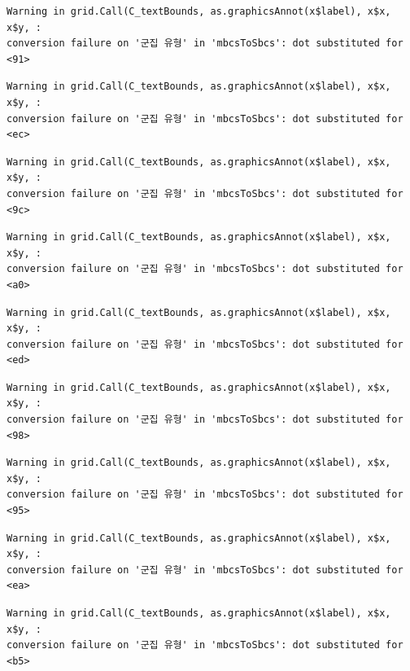 \documentclass[
  letterpaper,
  DIV=11,
  numbers=noendperiod]{scrreprt}
\begin{document}
\begin{verbatim}
Warning in grid.Call(C_textBounds, as.graphicsAnnot(x$label), x$x, x$y, :
conversion failure on '군집 유형' in 'mbcsToSbcs': dot substituted for <91>
\end{verbatim}

\begin{verbatim}
Warning in grid.Call(C_textBounds, as.graphicsAnnot(x$label), x$x, x$y, :
conversion failure on '군집 유형' in 'mbcsToSbcs': dot substituted for <ec>
\end{verbatim}

\begin{verbatim}
Warning in grid.Call(C_textBounds, as.graphicsAnnot(x$label), x$x, x$y, :
conversion failure on '군집 유형' in 'mbcsToSbcs': dot substituted for <9c>
\end{verbatim}

\begin{verbatim}
Warning in grid.Call(C_textBounds, as.graphicsAnnot(x$label), x$x, x$y, :
conversion failure on '군집 유형' in 'mbcsToSbcs': dot substituted for <a0>
\end{verbatim}

\begin{verbatim}
Warning in grid.Call(C_textBounds, as.graphicsAnnot(x$label), x$x, x$y, :
conversion failure on '군집 유형' in 'mbcsToSbcs': dot substituted for <ed>
\end{verbatim}

\begin{verbatim}
Warning in grid.Call(C_textBounds, as.graphicsAnnot(x$label), x$x, x$y, :
conversion failure on '군집 유형' in 'mbcsToSbcs': dot substituted for <98>
\end{verbatim}

\begin{verbatim}
Warning in grid.Call(C_textBounds, as.graphicsAnnot(x$label), x$x, x$y, :
conversion failure on '군집 유형' in 'mbcsToSbcs': dot substituted for <95>
\end{verbatim}

\begin{verbatim}
Warning in grid.Call(C_textBounds, as.graphicsAnnot(x$label), x$x, x$y, :
conversion failure on '군집 유형' in 'mbcsToSbcs': dot substituted for <ea>
\end{verbatim}

\begin{verbatim}
Warning in grid.Call(C_textBounds, as.graphicsAnnot(x$label), x$x, x$y, :
conversion failure on '군집 유형' in 'mbcsToSbcs': dot substituted for <b5>
\end{verbatim}
\end{document}

